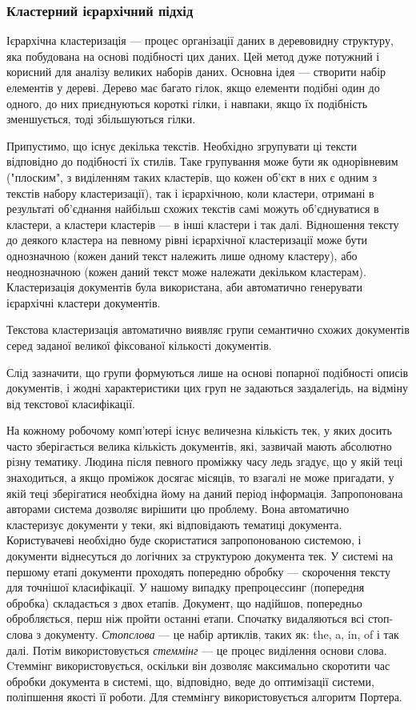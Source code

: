 \subsubsection{Кластерний ієрархічний підхід}
Ієрархічна кластеризація — процес організації даних в деревовидну структуру, яка побудована на основі подібності цих даних. Цей метод дуже потужний і корисний для аналізу великих наборів даних. Основна ідея — створити набір елементів у дереві. Дерево має багато гілок, якщо елементи подібні один до одного, до них приєднуються короткі гілки, і навпаки, якщо їх подібність зменшується, тоді збільшуються гілки.

Припустимо, що існує декілька текстів. Необхідно згрупувати ці тексти відповідно до подібності їх стилів. Таке групування може бути як однорівневим ("плоским", з виділенням таких кластерів, що кожен об'єкт в них є одним з текстів набору кластеризації), так і ієрархічною, коли кластери, отримані в результаті об'єднання найбільш схожих текстів самі можуть об'єднуватися в кластери, а кластери кластерів — в інші кластери і так далі. Відношення тексту до деякого кластера на певному рівні ієрархічної кластеризації може бути однозначною (кожен даний текст належить лише одному кластеру), або неоднозначною (кожен даний текст може належати декільком кластерам). Кластеризація документів була використана, аби автоматично генерувати ієрархічні кластери документів.

Текстова кластеризація автоматично виявляє групи семантично схожих документів серед заданої великої фіксованої кількості документів.

Слід зазначити, що групи формуються лише на основі попарної подібності описів документів, і жодні характеристики цих груп не задаються заздалегідь, на відміну від текстової класифікації.

На кожному робочому комп'ютері існує величезна кількість тек, у яких досить часто зберігається велика кількість документів, які, зазвичай мають абсолютно різну тематику. Людина після певного проміжку часу ледь згадує, що у якій теці знаходиться, а якщо проміжок досягає місяців, то взагалі не може пригадати, у якій теці зберігатися необхідна йому на даний період інформація. Запропонована авторами система дозволяє вирішити цю проблему. Вона автоматично кластеризує документи у теки, які відповідають тематиці документа. Користувачеві необхідно буде скористатися запропонованою системою, і документи віднесуться до логічних за структурою документа тек. У системі на першому етапі документи проходять попередню обробку — скорочення тексту для точнішої класифікації. У нашому випадку препроцессинг (попередня обробка) складається з двох етапів. Документ, що надійшов, попередньо обробляється, перш ніж пройти останні етапи. Спочатку видаляються всі стоп-слова з документу. \textit{Стопслова} — це набір артиклів, таких як: the, a, in, of і так далі. Потім використовується \textit{стеммінг} — це процес виділення основи слова. Cтеммінг використовується, оскільки він дозволяє максимально скоротити час обробки документа в системі, що, відповідно, веде до оптимізації системи, поліпшення якості її роботи. Для стеммінгу використовується алгоритм Портера.

